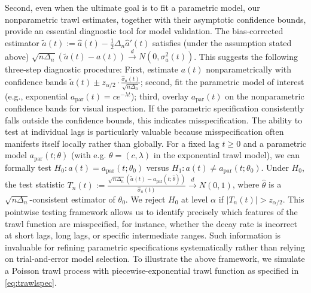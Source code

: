\documentclass{article}
\theoremstyle{plain}
\theoremstyle{definition}
\theoremstyle{remark}
\begin{document}
Second, even when the ultimate goal is to fit a parametric model, our nonparametric trawl estimates, together with their asymptotic confidence bounds, provide an essential diagnostic tool for model validation. The bias-corrected estimator $\tilde{a}(t) := \hat{a}(t) - \frac{1}{2}\Delta_n\hat{a}'(t)$ satisfies (under the assumption stated above)
$\sqrt{n\Delta_{n}}(\tilde{a}(t)-a(t)) \overset{d}{\rightarrow} N(0,\sigma_{a}^{2}(t))$. 
 This suggests the following three-step diagnostic procedure: First, estimate $a(t)$ nonparametrically with confidence bands $\tilde{a}(t) \pm z_{\alpha/2} \cdot \frac{\hat{\sigma}_a(t)}{\sqrt{n\Delta_n}}$; second, fit the parametric model of interest (e.g., exponential $a_{\text{par}}(t) = ce^{-\lambda t}$); third, overlay $a_{\text{par}}(t)$ on the nonparametric confidence bands for visual inspection. If the parametric specification consistently falls outside the confidence bounds, this indicates misspecification.
The ability to test at individual lags is particularly valuable because misspecification often manifests itself locally rather than globally. For a fixed lag $t \geq 0$ and a parametric model $a_{\text{par}}(t; \theta)$ (with e.g. $\theta=(c, \lambda)$ in the exponential trawl model), we can formally test 
$H_0: a(t) = a_{\text{par}}(t; \theta_0)$ versus $H_1: a(t) \neq a_{\text{par}}(t; \theta_0)$.
Under $H_0$, the test statistic
$T_n(t) := \frac{\sqrt{n\Delta_n}(\tilde{a}(t) - a_{\text{par}}(t; \hat{\theta}))}{\hat{\sigma}_a(t)} \overset{d}{\rightarrow} N(0, 1)$, 
where $\hat{\theta}$ is a $\sqrt{n\Delta_n}$-consistent estimator of $\theta_0$. We reject $H_0$ at level $\alpha$ if $|T_n(t)| > z_{\alpha/2}$.
This pointwise testing framework allows us to identify precisely which features of the trawl function are misspecified, for instance, whether the decay rate is incorrect at short lags, long lags, or specific intermediate ranges. Such information is invaluable for refining parametric specifications systematically rather than relying on trial-and-error model selection.
To illustrate the above framework, we simulate a Poisson trawl process with piecewise-exponential trawl function as specified in \eqref{eq:trawlspec}.
\end{document}

